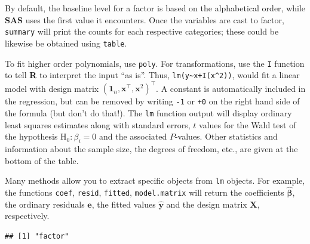 \documentclass[
  11pt,
  letterpaper,
]{book}
\newenvironment{Shaded}{\begin{snugshade}}{\end{snugshade}}
\newcommand{\CommentTok}[1]{\textcolor[rgb]{0.56,0.35,0.01}{\textit{#1}}}
\newcommand{\DataTypeTok}[1]{\textcolor[rgb]{0.13,0.29,0.53}{#1}}
\newcommand{\KeywordTok}[1]{\textcolor[rgb]{0.13,0.29,0.53}{\textbf{#1}}}
\newcommand{\NormalTok}[1]{#1}
\newcommand{\OperatorTok}[1]{\textcolor[rgb]{0.81,0.36,0.00}{\textbf{#1}}}
\newcommand{\StringTok}[1]{\textcolor[rgb]{0.31,0.60,0.02}{#1}}
\theoremstyle{definition}
\theoremstyle{definition}
\theoremstyle{definition}
\theoremstyle{remark}
\begin{document}
By default, the baseline level for a factor is based on the alphabetical order, while \textbf{SAS} uses the first value it encounters. Once the variables are cast to factor, \texttt{summary} will print the counts for each respective categories; these could be likewise be obtained using \texttt{table}.

To fit higher order polynomials, use \texttt{poly}. For transformations, use the \texttt{I} function to tell \textbf{R} to interpret the input ``as is''. Thus, \texttt{lm(y\textasciitilde{}x+I(x\^{}2))}, would fit a linear model with design matrix \((\boldsymbol{1}_n, \mathbf{x}^\top, \mathbf{x}^2)^\top\). A constant is automatically included in the regression, but can be removed by writing \texttt{-1} or \texttt{+0} on the right hand side of the formula (but don't do that!). The \texttt{lm} function output will display ordinary least squares estimates along with standard errors, \(t\) values for the Wald test of the hypothesis \(\mathrm{H}_0: \beta_i=0\) and the associated \(P\)-values. Other statistics and information about the sample size, the degrees of freedom, etc., are given at the bottom of the table.

Many methods allow you to extract specific objects from \texttt{lm} objects. For example, the functions \texttt{coef}, \texttt{resid}, \texttt{fitted}, \texttt{model.matrix} will return the coefficients \(\widehat{\boldsymbol{\beta}}\), the ordinary residuals \(\boldsymbol{e}\), the fitted values \(\widehat{\boldsymbol{y}}\) and the design matrix \(\mathbf{X}\), respectively.

\begin{Shaded}
\end{Shaded}

\begin{verbatim}
## [1] "factor"
\end{verbatim}

\begin{Shaded}
\end{Shaded}
\end{document}

